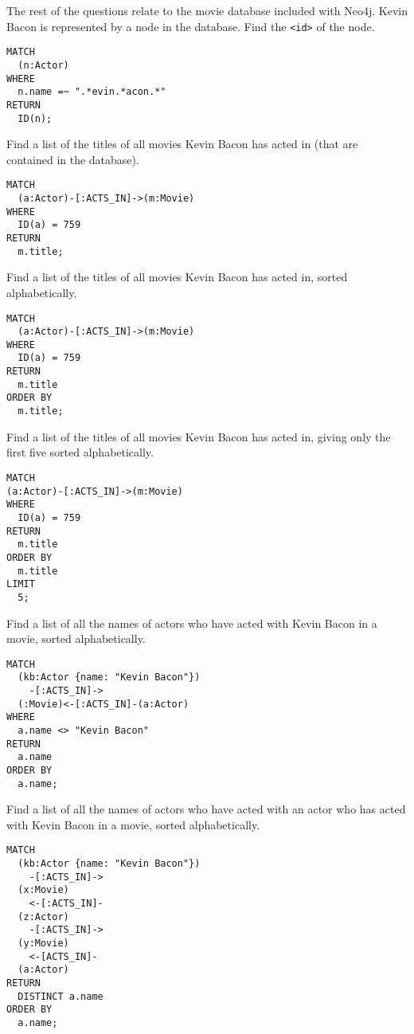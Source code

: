 \begin{questions}
\question
The rest of the questions relate to the movie database included with Neo4j.
Kevin Bacon is represented by a node in the database.
Find the \texttt{<id>} of the node.
\begin{solution}
\begin{verbatim}
MATCH
  (n:Actor)
WHERE
  n.name =~ ".*evin.*acon.*"
RETURN
  ID(n);
\end{verbatim}
\end{solution}


\question
Find a list of the titles of all movies Kevin Bacon has acted in (that are contained in the database).
\begin{solution}
\begin{verbatim}
MATCH
  (a:Actor)-[:ACTS_IN]->(m:Movie)
WHERE
  ID(a) = 759
RETURN
  m.title;
\end{verbatim}
\end{solution}


\question
Find a list of the titles of all movies Kevin Bacon has acted in, sorted alphabetically.
\begin{solution}
\begin{verbatim}
MATCH
  (a:Actor)-[:ACTS_IN]->(m:Movie)
WHERE
  ID(a) = 759
RETURN
  m.title
ORDER BY
  m.title;
\end{verbatim}
\end{solution}


\question
Find a list of the titles of all movies Kevin Bacon has acted in, giving only the first five sorted alphabetically.
\begin{solution}
\begin{verbatim}
MATCH
(a:Actor)-[:ACTS_IN]->(m:Movie)
WHERE
  ID(a) = 759
RETURN
  m.title
ORDER BY
  m.title
LIMIT
  5;
\end{verbatim}
\end{solution}


\question
Find a list of all the names of actors who have acted with Kevin Bacon in a movie, sorted alphabetically.
\begin{solution}
\begin{verbatim}
MATCH
  (kb:Actor {name: "Kevin Bacon"})
    -[:ACTS_IN]->
  (:Movie)<-[:ACTS_IN]-(a:Actor)
WHERE
  a.name <> "Kevin Bacon"
RETURN
  a.name
ORDER BY
  a.name;
\end{verbatim}
\end{solution}

\question
Find a list of all the names of actors who have acted with an actor who has acted with Kevin Bacon in a movie, sorted alphabetically.
\begin{solution}
  \begin{verbatim}
MATCH
  (kb:Actor {name: "Kevin Bacon"})
    -[:ACTS_IN]->
  (x:Movie)
    <-[:ACTS_IN]-
  (z:Actor)
    -[:ACTS_IN]->
  (y:Movie)
    <-[ACTS_IN]-
  (a:Actor)
RETURN
  DISTINCT a.name
ORDER BY
  a.name;
  \end{verbatim}
\end{solution}



\end{questions}
